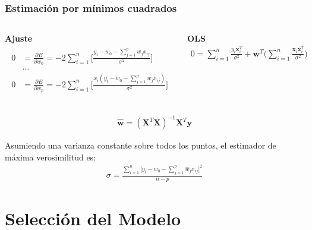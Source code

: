 \documentclass[aspectratio=169, 10pt]{beamer}
\begin{document}
\begin{frame}
\frametitle{ Estimaci\'on por m\'inimos cuadrados}
 \begin{columns}[T]
\begin{block}{\textbf{Ajuste}}
	\small
\begin{align*}
	\begin{matrix}
		0&=\frac{\partial E}{\partial w_0}=-2 \sum_{i=1}^n \Big[ \frac{y_i-w_0-\sum_{j=1}^{p} w_j x_{ij}}{\sigma^2}\Big] \\
		&\ldots \\
		0&=\frac{\partial E}{\partial w_p}=-2 \sum_{i=1}^n \Big[  \frac{x_i \left(y_i-w_0-\sum_{j=1}^{p} w_j x_{ij}\right)}{\sigma^2}\Big]
	\end{matrix} 
	\label{eq:poly-partial}
\end{align*}
\end{block}
\begin{block}{\textbf{OLS}}
	\begin{align*}
		0=\sum_{i=1}^n \frac{y_i \mathbf x_i^T}{\sigma^2} + \mathbf{w}^T \Big(\sum_{i=1}^n \frac{\mathbf x_i \mathbf x_i^T}{\sigma^2}\Big)
	\end{align*}
\end{block}

\end{columns}
\vspace{0.3cm}
\begin{tcolorbox}[colback=AccentBlue!10, colframe=AccentBlue, arc=4pt,
	boxsep=1pt, left=5pt, right=5pt, top=3pt, bottom=3pt]
	\begin{align*}
		\mathbf{\hat w}=(\mathbf X^T \mathbf X)^{-1} \mathbf X ^T \mathbf{y}
	\end{align*}
\end{tcolorbox}
\pause
Asumiendo una varianza constante sobre todos los puntos, el estimador de m\'axima verosimilitud es: 
\begin{align*}
	\sigma=\frac{\sum_{i=1}^n  \Big[ y_i-w_0-\sum_{j=1}^{p} \hat w_j x_{ij} \Big]^2}{n-p}
\end{align*}

\end{frame}



\section{Selecci\'on del Modelo}
\end{document}
